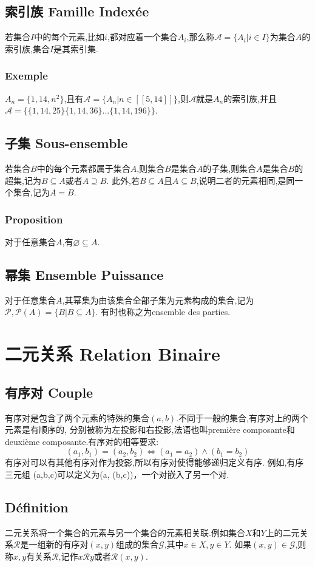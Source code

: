 \documentclass[12pt, a4paper, oneside]{ctexbook}
\begin{document}
  \subsection{索引族 Famille Indexée}
  若集合$I$中的每个元素,比如$i$,都对应着一个集合$A_i$,那么称$\mathscr{A}=\{A_i|i\in I\}$为集合$A$的索引族,集合$I$是其索引集.
  \subsubsection{Exemple}
  $A_n=\{1,14,n^2\}$,且有$\mathscr{A}=\{A_n|n\in [\![5,14]\!]\}$,则$\mathscr{A}$就是$A_n$的索引族,并且$\mathscr{A}=\{ \{1,14,25\}\{1,14,36\}\dots\{1,14,196\}\}$.
  \subsection{子集 Sous-ensemble}
  若集合$B$中的每个元素都属于集合$A$,则集合$B$是集合$A$的子集,则集合$A$是集合$B$的超集,记为$B\subseteq A$或者$A\supseteq B$.
  此外,若$B\subseteq A$且$A\subseteq B$,说明二者的元素相同,是同一个集合,记为$A=B$.
  \subsubsection{Proposition}
  对于任意集合$A$,有$\varnothing\subseteq A$.
  \subsection{幂集 Ensemble Puissance}
  对于任意集合$A$,其幂集为由该集合全部子集为元素构成的集合,记为$\mathcal{P},\mathcal{P}(A)=\{B| B\subseteq A\}$.
  有时也称之为ensemble des parties.

  \section{二元关系 Relation Binaire}
  \subsection{有序对 Couple}
  有序对是包含了两个元素的特殊的集合$(a,b)$.不同于一般的集合,有序对上的两个元素是有顺序的,
  分别被称为左投影和右投影,法语也叫première composante和deuxième composante.有序对的相等要求:
  $$
  (a_1,b_1)=(a_2,b_2)\Leftrightarrow (a_1=a_2)\land(b_1=b_2)
  $$有序对可以有其他有序对作为投影,所以有序对使得能够递归定义有序.
  例如,有序三元组 (a,b,c)可以定义为(a, (b,c))，一个对嵌入了另一个对.
  \subsection{Définition}
  二元关系将一个集合的元素与另一个集合的元素相关联.例如集合$X$和$Y$上的二元关系$\mathcal{R} $是一组新的有序对$(x,y)\text{组成的集合$\mathcal{G} $,其中}x\in X,y\in Y$.
  如果$(x,y)\in\mathcal{G}$,则称$x,y$有关系$\mathcal{R}$,记作$x\mathcal{R}y$或者$\mathcal{R}(x,y)$.
\end{document}
